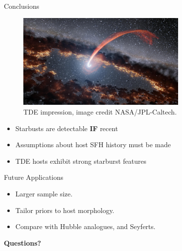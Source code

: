 \documentclass{beamer}
\begin{document}
\begin{frame}{Conclusions}
  \begin{figure}
    \includegraphics[width=0.75\textwidth]{tidal_disruption_event}
    \caption{TDE impression, image credit NASA/JPL-Caltech.}
    \label{img:tde_impression}
  \end{figure}
  \begin{itemize}
    \item Starbusts are detectable \textbf{IF} recent %
    \item Assumptions about host SFH history must be made
    \item TDE hosts exhibit strong starburst features
  \end{itemize}
\end{frame}

\begin{frame}{Future Applications}
  \begin{itemize}
    \item Larger sample size.
    \item Tailor priors to host morphology.
    \item Compare with Hubble analogues, and Seyferts.
  \end{itemize}
\end{frame}

\begin{frame}{}
  \centering
  \large
  \textbf{Questions?}
\end{frame}
\end{document}
